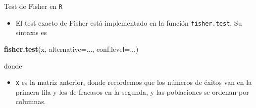 \documentclass[
  ignorenonframetext,
]{beamer}
\newenvironment{Shaded}{\begin{snugshade}}{\end{snugshade}}
\newcommand{\DataTypeTok}[1]{\textcolor[rgb]{0.13,0.29,0.53}{#1}}
\newcommand{\KeywordTok}[1]{\textcolor[rgb]{0.13,0.29,0.53}{\textbf{#1}}}
\newcommand{\NormalTok}[1]{#1}
\providecommand{\tightlist}{%
  \setlength{\itemsep}{0pt}\setlength{\parskip}{0pt}}
\begin{document}
\begin{frame}[fragile]{Test de Fisher en \texttt{R}}
\protect\hypertarget{test-de-fisher-en-r}{}
\begin{itemize}
\tightlist
\item
  El test exacto de Fisher está implementado en la función
  \texttt{fisher.test}. Su sintaxis es
\end{itemize}

\begin{Shaded}
\begin{Highlighting}[]
\KeywordTok{fisher.test}\NormalTok{(x, }\DataTypeTok{alternative=}\NormalTok{..., }\DataTypeTok{conf.level=}\NormalTok{...)}
\end{Highlighting}
\end{Shaded}

donde

\begin{itemize}
\tightlist
\item
  \texttt{x} es la matriz anterior, donde recordemos que los números de
  éxitos van en la primera fila y los de fracasos en la segunda, y las
  poblaciones se ordenan por columnas.
\end{itemize}
\end{frame}
\end{document}
